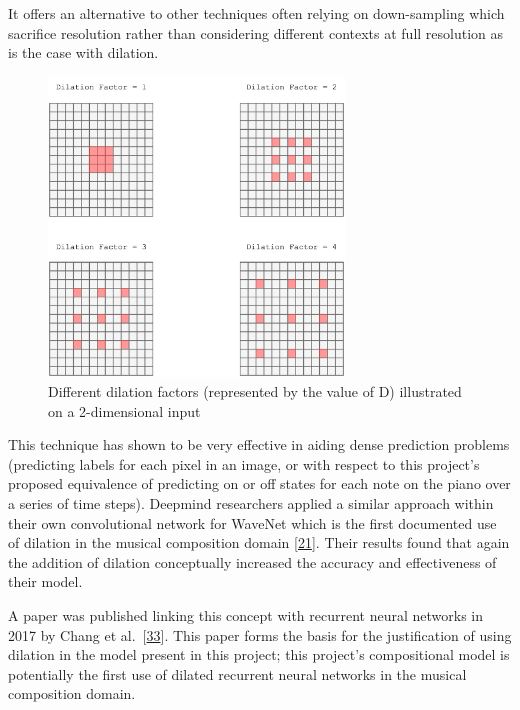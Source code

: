 \documentclass[12pt,]{article}
\begin{document}
It offers an alternative to other techniques often relying on
down-sampling which sacrifice resolution rather than considering
different contexts at full resolution as is the case with dilation.

\begin{figure}
\centering
\includegraphics[width=0.7\textwidth,height=\textheight]{Images/dilation2d.png}
\caption{Different dilation factors (represented by the value of D)
illustrated on a 2-dimensional input}
\end{figure}

This technique has shown to be very effective in aiding dense prediction
problems (predicting labels for each pixel in an image, or with respect
to this project's proposed equivalence of predicting on or off states
for each note on the piano over a series of time steps). Deepmind
researchers applied a similar approach within their own convolutional
network for WaveNet which is the first documented use of dilation in the
musical composition domain
{[}\protect\hyperlink{ref-oord2016wavenet}{21}{]}. Their results found
that again the addition of dilation conceptually increased the accuracy
and effectiveness of their model.

A paper was published linking this concept with recurrent neural
networks in 2017 by Chang et
al.~{[}\protect\hyperlink{ref-chang2017dilated}{33}{]}. This paper forms
the basis for the justification of using dilation in the model present
in this project; this project's compositional model is potentially the
first use of dilated recurrent neural networks in the musical
composition domain.
\end{document}
